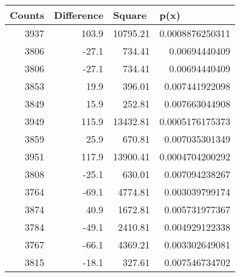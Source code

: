 	\begin{longtable}{|r|r|r|r|}
\hline
\multicolumn{1}{|l|}{Counts} & \multicolumn{1}{l|}{Difference} & \multicolumn{1}{l|}{Square} & \multicolumn{1}{l|}{p(x)} \\ \hline
3937                         & 103.9                           & 10795.21                    & 0.0008876250311           \\ \hline
3806                         & -27.1                           & 734.41                      & 0.00694440409             \\ \hline
3806                         & -27.1                           & 734.41                      & 0.00694440409             \\ \hline
3853                         & 19.9                            & 396.01                      & 0.007441922098            \\ \hline
3849                         & 15.9                            & 252.81                      & 0.007663044908            \\ \hline
3949                         & 115.9                           & 13432.81                    & 0.0005176175373           \\ \hline
3859                         & 25.9                            & 670.81                      & 0.007035301349            \\ \hline
3951                         & 117.9                           & 13900.41                    & 0.0004704200292           \\ \hline
3808                         & -25.1                           & 630.01                      & 0.007094238267            \\ \hline
3764                         & -69.1                           & 4774.81                     & 0.003039799174            \\ \hline
3874                         & 40.9                            & 1672.81                     & 0.005731977367            \\ \hline
3784                         & -49.1                           & 2410.81                     & 0.004929122338            \\ \hline
3767                         & -66.1                           & 4369.21                     & 0.003302649081            \\ \hline
3815                         & -18.1                           & 327.61                      & 0.007546734702            \\ \hline

\end{longtable}

